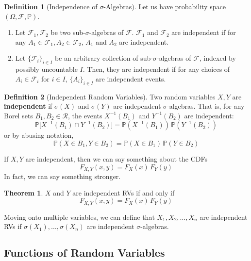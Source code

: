 \documentclass{article}
\theoremstyle{definition}
\newtheorem{theorem}{Theorem}[section]
\theoremstyle{remark}
\theoremstyle{definition}
\newtheorem{definition}{Definition}[section]
\begin{document}
\begin{definition}[Independence of $\sigma$-Algebras]
Let us have probability space $(\Omega, \mathcal{F}, \mathbb{P})$. 
\begin{enumerate}
    \item Let $\mathcal{F}_1, \mathcal{F}_2$ be two sub-$\sigma$-algebras of $\mathcal{F}$. $\mathcal{F}_1$ and $\mathcal{F}_2$ are independent if for any $A_1 \in \mathcal{F}_1, A_2 \in \mathcal{F}_2$, $A_1$ and $A_2$ are independent. 
    \item Let $\{ \mathcal{F}_i\}_{i \in I}$ be an arbitrary collection of sub-$\sigma$-algebras of $\mathcal{F}$, indexed by possibly uncountable $I$. Then, they are independent if for any choices of $A_i \in \mathcal{F}_i$ for $i \in I$, $\{A_i\}_{i \in I}$ are independent events. 
\end{enumerate}
\end{definition}

\begin{definition}[Independent Random Variables]
Two random variables $X, Y$ are \textbf{independent} if $\sigma(X)$ and $\sigma(Y)$ are independent $\sigma$-algebras. That is, for any Borel sets $B_1, B_2 \in \mathcal{R}$, the events $X^{-1}(B_1)$ and $Y^{-1}(B_2)$ are independent: 
\[\mathbb{P}\big[ X^{-1}(B_1) \cap Y^{-1}(B_2) \big] = \mathbb{P}(X^{-1}(B_1)) \, \mathbb{P}(Y^{-1}(B_2))\]
or by abusing notation, 
\[\mathbb{P}(X \in B_1, Y \in B_2) = \mathbb{P}(X \in B_1) \, \mathbb{P}(Y \in B_2)\]
\end{definition}

If $X, Y$ are independent, then we can say something about the CDFs 
\[F_{X, Y} (x, y) = F_X (x) \, F_Y (y)\]
In fact, we can say something stronger. 

\begin{theorem}
$X$ and $Y$ are independent RVs if and only if 
\[F_{X, Y} (x, y) = F_X (x) \, F_Y (y)\]
\end{theorem}

Moving onto multiple variables, we can define that $X_1, X_2, \ldots, X_n$ are independent RVs if $\sigma(X_1), \ldots, \sigma(X_n)$ are independent $\sigma$-algebras. 

\subsection{Functions of Random Variables}
\end{document}
